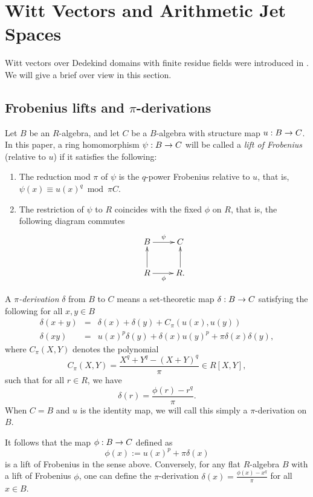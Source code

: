 \documentclass{amsart}
\numberwithin{equation}{section}
\def \d{\delta}
\begin{document}
\section{Witt Vectors and Arithmetic Jet Spaces}
Witt vectors over Dedekind domains with finite residue fields were introduced 
in \cite{MR2833791}. We will give a brief over view in this section.

\subsection{Frobenius lifts and $\pi$-derivations}
Let $B$ be an $R$-algebra, and let $C$ be a $B$-algebra with structure map $u:B \rightarrow C$.
In this paper, a ring homomorphism $\psi:B\rightarrow C$ will be called a
{\it lift of Frobenius} (relative to $u$) if it satisfies the following:
\begin{enumerate}
\item The reduction mod $\pi$ of $\psi$ is the $q$-power Frobenius relative 
to $u$, that is,
$\psi(x) \equiv u(x)^q \bmod \pi C$.

\item The restriction of $\psi$ to $R$ coincides with the fixed $\phi$ on $R$,
that is, the following diagram commutes
        $$\xymatrix{
        B \ar[r]^\psi & C \\
        R \ar[r]_{\phi} \ar[u] & R. \ar[u] 
        }$$
\end{enumerate}

A \emph{$\pi$-derivation} $\d$ from $B$ to $C$ means a set-theoretic map
$\d:B \map C$ satisfying the following for all $x,y \in B$
        \begin{eqnarray*}
        \label{der}
        \d(x+y) &=& \d (x) + \d (y) + C_\pi(u(x),u(y)) \\
        \d(xy) &=& u(x)^p \d (y) +  \d (x) u(y)^p + \pi \d (x) \d (y),
        \end{eqnarray*}
where $C_\pi(X,Y)$ denotes the polynomial
        $$
        C_\pi(X,Y) = \frac{X^q + Y^q - (X+Y)^q}{\pi} \in R[X,Y],
        $$
such that for all $r\in R$, we have
$$
\d(r) = \frac{\phi(r)-r^q}{\pi}.
$$
When $C=B$ and $u$ is the identity map, we will call this simply a 
$\pi$-derivation on $B$.

It follows that the map $\phi: B \rightarrow C$ defined as
        $$
        \phi(x) := u(x)^p + \pi \d (x)
        $$
is a lift of Frobenius in the sense above. Conversely,
for any flat $R$-algebra $B$ with a lift of Frobenius $\phi$, one can define
the $\pi$-derivation $\d(x)= \frac{\phi(x)-x^q}{\pi}$ for all $x \in B$.
\end{document}
